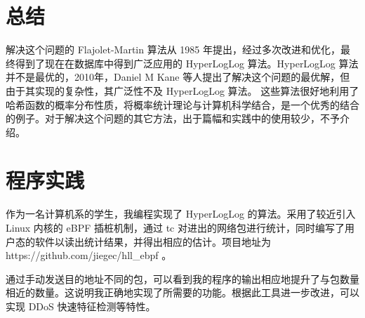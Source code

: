 \documentclass{ctexart}
\begin{document}
\section{总结}
    解决这个问题的 Flajolet-Martin 算法从 1985 年提出，经过多次改进和优化，最终得到了现在在数据库中得到广泛应用的 HyperLogLog 算法。HyperLogLog 算法并不是最优的，2010年，Daniel M Kane 等人提出了解决这个问题的最优解，但由于其实现的复杂性，其广泛性不及 HyperLogLog 算法。\cite{Kane:2010fp} 这些算法很好地利用了哈希函数的概率分布性质，将概率统计理论与计算机科学结合，是一个优秀的结合的例子。对于解决这个问题的其它方法，出于篇幅和实践中的使用较少，不予介绍。

\section{程序实践}
    作为一名计算机系的学生，我编程实现了 HyperLogLog 的算法。采用了较近引入 Linux 内核的 eBPF 插桩机制，通过 tc 对进出的网络包进行统计，同时编写了用户态的软件以读出统计结果，并得出相应的估计。项目地址为 https://github.com/jiegec/hll\_ebpf 。

    通过手动发送目的地址不同的包，可以看到我的程序的输出相应地提升了与包数量相近的数量。这说明我正确地实现了所需要的功能。根据此工具进一步改进，可以实现 DDoS 快速特征检测等特性。

\printbibliography[title=引用文献]
\end{document}
